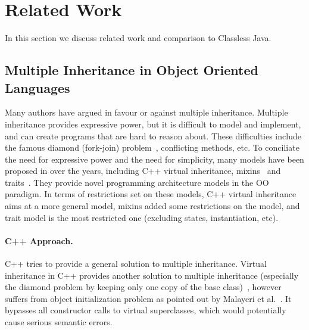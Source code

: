 \section{Related Work}\label{sec:related}
In this section we discuss related work and comparison to Classless Java.



\subsection{Multiple Inheritance in Object Oriented Languages}
Many authors have argued in favour or against multiple inheritance.  Multiple inheritance provides
expressive power, but it is difficult to model and implement, and can create
programs that are hard to reason about. These difficulties include the famous
diamond (fork-join) problem~\cite{bracha90mixin,Sak89dis}, conflicting methods, etc.
To conciliate the need for expressive power and the need for simplicity, many
models have been proposed in over the years, including C++ virtual
inheritance, mixins~\cite{bracha90mixin} and traits~\cite{scharli03traits}.
They provide novel programming architecture models in the OO paradigm. In terms
of restrictions set on these models, C++ virtual inheritance aims at a more
general model, mixins added some restrictions on the model, and trait model is
the most restricted one (excluding states, instantiation, etc).

\paragraph{C++ Approach.}
C++ tries to provide a general solution to multiple inheritance. Virtual
inheritance in C++ provides another solution to multiple inheritance (especially
the diamond problem by keeping only one copy of the base
class)~\cite{ellis1990annotated}, however suffers from object initialization
problem as pointed out by Malayeri et al.~\cite{malayeri2009cz}. It bypasses all
constructor calls to virtual superclasses, which would potentially cause serious
semantic errors. 

